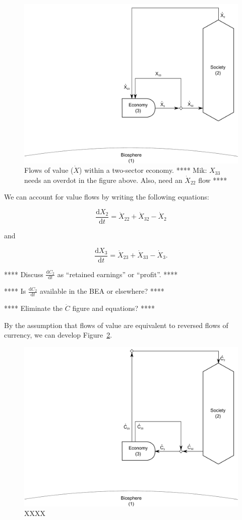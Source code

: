 \begin{figure}[h!]
\centering
\includegraphics[width=0.8\linewidth]{Part_3/Chapter_Values/images/2_sector_value.pdf}
\caption{Flows of value ($\dot{X}$) within a two-sector economy.
**** Mik: $X_{33}$ needs an overdot in the figure above. Also, need an $\dot{X}_{22}$ flow ****}
\label{fig:B_value}
\end{figure}

We can account for value flows by writing
the following equations:

\begin{equation}
	\frac{\mathrm{d}X_2}{\mathrm{d}t}
	= \dot{X}_{22}
	+ \dot{X}_{32}
	- \dot{X}_{2}
\end{equation}

\noindent and

\begin{equation}
	\frac{\mathrm{d}X_3}{\mathrm{d}t}
	= \dot{X}_{23}
	+ \dot{X}_{33}
	- \dot{X}_{3}.
\end{equation}

**** Discuss $\frac{\mathrm{d}C_2}{\mathrm{d}t}$ as ``retained earnings'' or ``profit''. ****

**** Is $\frac{\mathrm{d}C_2}{\mathrm{d}t}$ available in the BEA or elsewhere? ****

**** Eliminate the $\dot{C}$ figure and equations? ****

By the assumption that flows of value are equivalent
to reversed flows of currency, we can develop Figure~\ref{fig:B_cash}.

\begin{figure}[h!]
\centering
\includegraphics[width=0.8\linewidth]{Part_3/Chapter_Values/images/2_sector_cash.pdf}
\caption{XXXX}
\label{fig:B_cash}
\end{figure}

